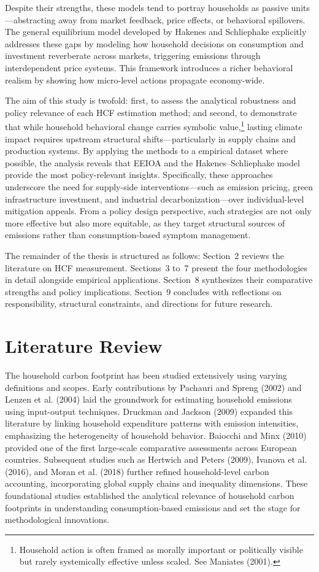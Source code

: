 \documentclass[12pt,a4paper]{article}%
\begin{document}
Despite their strengths, these models tend to portray households as passive units—abstracting away from market feedback, price effects, or behavioral spillovers. The general equilibrium model developed by Hakenes and Schliephake explicitly addresses these gaps by modeling how household decisions on consumption and investment reverberate across markets, triggering emissions through interdependent price systems. This framework introduces a richer behavioral realism by showing how micro-level actions propagate economy-wide.

The aim of this study is twofold: first, to assess the analytical robustness and policy relevance of each HCF estimation method; and second, to demonstrate that while household behavioral change carries symbolic value,\footnote{Household action is often framed as morally important or politically visible but rarely systemically effective unless scaled. See Maniates (2001).} lasting climate impact requires upstream structural shifts—particularly in supply chains and production systems. By applying the methods to a empirical dataset where possible, the analysis reveals that EEIOA and the Hakenes--Schliephake model provide the most policy-relevant insights. Specifically, these approaches underscore the need for supply-side interventions—such as emission pricing, green infrastructure investment, and industrial decarbonization—over individual-level mitigation appeals. From a policy design perspective, such strategies are not only more effective but also more equitable, as they target structural sources of emissions rather than consumption-based symptom management.

The remainder of the thesis is structured as follows: Section~2 reviews the literature on HCF measurement. Sections~3 to~7 present the four methodologies in detail alongside empirical applications. Section~8 synthesizes their comparative strengths and policy implications. Section~9 concludes with reflections on responsibility, structural constraints, and directions for future research.

\section{Literature Review}
The household carbon footprint has been studied extensively using varying definitions and scopes. Early contributions by Pachauri and Spreng (2002) and Lenzen et al. (2004) laid the groundwork for estimating household emissions using input-output techniques. Druckman and Jackson (2009) expanded this literature by linking household expenditure patterns with emission intensities, emphasizing the heterogeneity of household behavior. Baiocchi and Minx (2010) provided one of the first large-scale comparative assessments across European countries. Subsequent studies such as Hertwich and Peters (2009), Ivanova et al. (2016), and Moran et al. (2018) further refined household-level carbon accounting, incorporating global supply chains and inequality dimensions. These foundational studies established the analytical relevance of household carbon footprints in understanding consumption-based emissions and set the stage for methodological innovations.
\end{document}

